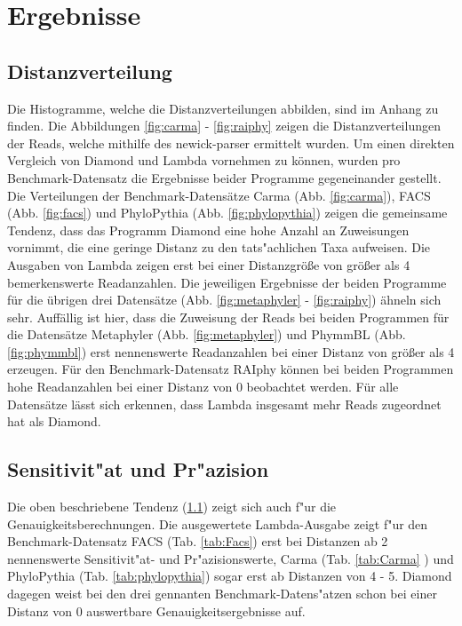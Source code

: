 \documentclass[10pt, a4paper]{report}[08.12.2015]
\begin{document}
  \chapter{Ergebnisse}
    \section{Distanzverteilung}
    \label{sec:distanzverteilung}
  Die Histogramme, welche die Distanzverteilungen abbilden, sind im Anhang zu finden. Die Abbildungen  \ref{fig:carma} - \ref{fig:raiphy}  zeigen die Distanzverteilungen der Reads, welche mithilfe des newick-parser ermittelt wurden. Um einen direkten Vergleich von Diamond und Lambda vornehmen zu k\"onnen, wurden pro Benchmark-Datensatz die Ergebnisse beider Programme gegeneinander gestellt.
  \newline
   Die Verteilungen der Benchmark-Datens\"atze Carma (Abb. \ref{fig:carma}), FACS (Abb. \ref{fig:facs}) und PhyloPythia (Abb. \ref{fig:phylopythia}) zeigen die gemeinsame Tendenz, dass das Programm Diamond eine hohe Anzahl an Zuweisungen vornimmt, die eine geringe Distanz zu den 
  tats"achlichen Taxa aufweisen. Die Ausgaben von Lambda zeigen erst bei einer Distanzgr\"o{\ss}e von gr\"o{\ss}er als 4 bemerkenswerte Readanzahlen.
  \newline
    Die jeweiligen Ergebnisse der beiden Programme f\"ur die \"ubrigen drei 		Datens\"atze (Abb. \ref{fig:metaphyler} - \ref{fig:raiphy}) \"ahneln sich sehr. Auff\"allig ist hier, dass
    die Zuweisung der Reads bei beiden Programmen f\"ur die Datens\"atze 			Metaphyler (Abb. \ref{fig:metaphyler}) und PhymmBL (Abb. \ref{fig:phymmbl}) erst nennenswerte Readanzahlen 		bei einer Distanz von gr\"o{\ss}er als 4 erzeugen. F\"ur den Benchmark-Datensatz
    RAIphy k\"onnen bei beiden Programmen hohe Readanzahlen bei einer Distanz
    von 0 beobachtet werden.    \newline
    F\"ur alle Datens\"atze l\"asst sich erkennen, dass Lambda insgesamt 
    mehr Reads zugeordnet hat als Diamond.
  
     \section{Sensitivit"at und Pr"azision}
       Die oben beschriebene Tendenz (\ref{sec:distanzverteilung}) zeigt sich auch f"ur die Genauigkeitsberechnungen. Die ausgewertete Lambda-Ausgabe zeigt f"ur den Benchmark-Datensatz FACS (Tab. \ref{tab:Facs}) erst bei Distanzen ab 2 nennenswerte  Sensitivit"at- und Pr"azisionswerte, Carma (Tab. \ref{tab:Carma} ) und PhyloPythia (Tab. \ref{tab:phylopythia}) sogar erst ab Distanzen von 4 - 5. Diamond dagegen weist bei den drei gennanten Benchmark-Datens"atzen schon bei einer Distanz von 0 auswertbare Genauigkeitsergebnisse auf.
     
\end{document}
